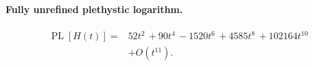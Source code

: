 \documentclass[10pt]{article}
\begin{document}
\paragraph{Fully unrefined plethystic logarithm.}
\[
\begin{aligned}
\operatorname{PL}[H(t)] ={}& 52t^{2}\,+90t^{4}\,-1520t^{6}\,+4585t^{8}\,+102164t^{10} \\
  &+ O(t^{11}).
\end{aligned}
\]
\end{document}
